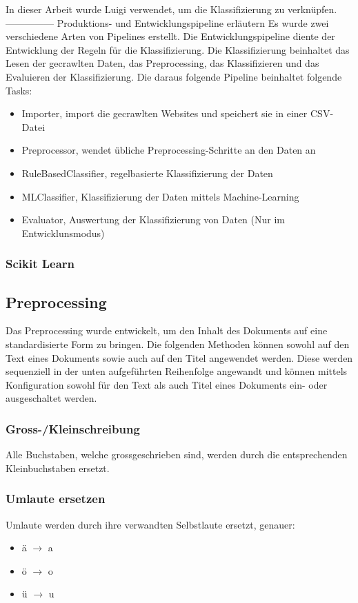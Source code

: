 In dieser Arbeit wurde Luigi verwendet, um die Klassifizierung zu verknüpfen.
--------------- Produktions- und Entwicklungspipeline erläutern
Es wurde zwei verschiedene Arten von Pipelines erstellt.
Die Entwicklungspipeline diente der Entwicklung der Regeln für die Klassifizierung.
Die Klassifizierung beinhaltet das Lesen der gecrawlten Daten, das Preprocessing, das Klassifizieren und das Evaluieren der Klassifizierung.
Die daraus folgende Pipeline beinhaltet folgende Tasks:
\begin{itemize}
	\item Importer, import die gecrawlten Websites und speichert sie in einer CSV-Datei
	\item Preprocessor, wendet übliche Preprocessing-Schritte an den Daten an
	\item RuleBasedClassifier, regelbasierte Klassifizierung der Daten 
	\item MLClassifier, Klassifizierung der Daten mittels Machine-Learning
	\item Evaluator, Auswertung der Klassifizierung von Daten (Nur im Entwicklunsmodus)
\end{itemize}
\subsubsection{Scikit Learn}
\subsection{Preprocessing}
Das Preprocessing wurde entwickelt, um den Inhalt des Dokuments auf eine standardisierte Form zu bringen.
Die folgenden Methoden können sowohl auf den Text eines Dokuments sowie auch auf den Titel angewendet werden.
Diese werden sequenziell in der unten aufgeführten Reihenfolge angewandt und können mittels Konfiguration sowohl für den Text als auch Titel eines Dokuments ein- oder ausgeschaltet werden.
\subsubsection{Gross-/Kleinschreibung}
Alle Buchstaben, welche grossgeschrieben sind, werden durch die entsprechenden Kleinbuchstaben ersetzt.
\subsubsection{Umlaute ersetzen}
Umlaute werden durch ihre verwandten Selbstlaute ersetzt, genauer:
\begin{itemize}
	\item ä $\rightarrow$ a
	\item ö $\rightarrow$ o
	\item ü $\rightarrow$ u
\end{itemize} 

